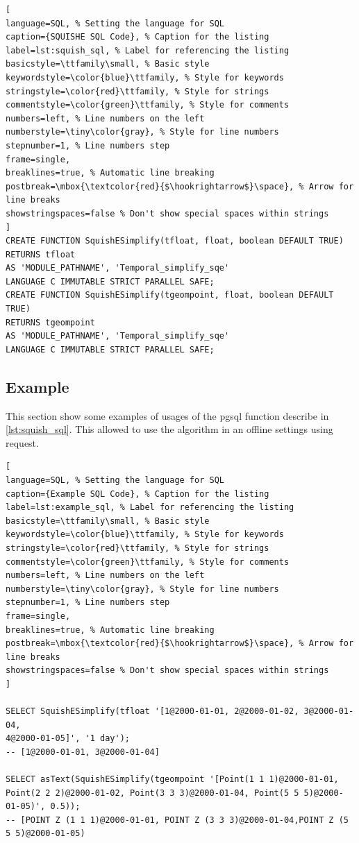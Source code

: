 \begin{minipage}{\linewidth}
\begin{lstlisting}[
language=SQL, % Setting the language for SQL
caption={SQUISHE SQL Code}, % Caption for the listing
label=lst:squish_sql, % Label for referencing the listing
basicstyle=\ttfamily\small, % Basic style
keywordstyle=\color{blue}\ttfamily, % Style for keywords
stringstyle=\color{red}\ttfamily, % Style for strings
commentstyle=\color{green}\ttfamily, % Style for comments
numbers=left, % Line numbers on the left
numberstyle=\tiny\color{gray}, % Style for line numbers
stepnumber=1, % Line numbers step
frame=single,
breaklines=true, % Automatic line breaking
postbreak=\mbox{\textcolor{red}{$\hookrightarrow$}\space}, % Arrow for line breaks
showstringspaces=false % Don't show special spaces within strings
]
CREATE FUNCTION SquishESimplify(tfloat, float, boolean DEFAULT TRUE)
RETURNS tfloat
AS 'MODULE_PATHNAME', 'Temporal_simplify_sqe'
LANGUAGE C IMMUTABLE STRICT PARALLEL SAFE;
CREATE FUNCTION SquishESimplify(tgeompoint, float, boolean DEFAULT TRUE)
RETURNS tgeompoint
AS 'MODULE_PATHNAME', 'Temporal_simplify_sqe'
LANGUAGE C IMMUTABLE STRICT PARALLEL SAFE;
\end{lstlisting}
\end{minipage}

\subsection{Example}
This section show some examples of usages of the pgsql function describe in \ref{lst:squish_sql}. This allowed to use the algorithm in an offline settings using request.


\begin{minipage}{\linewidth}
\begin{lstlisting}[
language=SQL, % Setting the language for SQL
caption={Example SQL Code}, % Caption for the listing
label=lst:example_sql, % Label for referencing the listing
basicstyle=\ttfamily\small, % Basic style
keywordstyle=\color{blue}\ttfamily, % Style for keywords
stringstyle=\color{red}\ttfamily, % Style for strings
commentstyle=\color{green}\ttfamily, % Style for comments
numbers=left, % Line numbers on the left
numberstyle=\tiny\color{gray}, % Style for line numbers
stepnumber=1, % Line numbers step
frame=single,
breaklines=true, % Automatic line breaking
postbreak=\mbox{\textcolor{red}{$\hookrightarrow$}\space}, % Arrow for line breaks
showstringspaces=false % Don't show special spaces within strings
]

SELECT SquishESimplify(tfloat '[1@2000-01-01, 2@2000-01-02, 3@2000-01-04,
4@2000-01-05]', '1 day');
-- [1@2000-01-01, 3@2000-01-04]

SELECT asText(SquishESimplify(tgeompoint '[Point(1 1 1)@2000-01-01,
Point(2 2 2)@2000-01-02, Point(3 3 3)@2000-01-04, Point(5 5 5)@2000-01-05)', 0.5));
-- [POINT Z (1 1 1)@2000-01-01, POINT Z (3 3 3)@2000-01-04,POINT Z (5 5 5)@2000-01-05)

\end{lstlisting}
\end{minipage}
